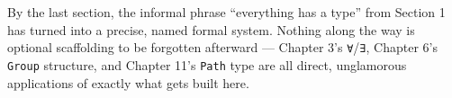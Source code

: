 By the last section, the informal phrase ``everything has a type'' from Section 1 has turned into a precise, named formal system. Nothing along the way is optional scaffolding to be forgotten afterward --- Chapter 3's \texttt{∀}/\texttt{∃}, Chapter 6's \texttt{Group} structure, and Chapter 11's \texttt{Path} type are all direct, unglamorous applications of exactly what gets built here.








